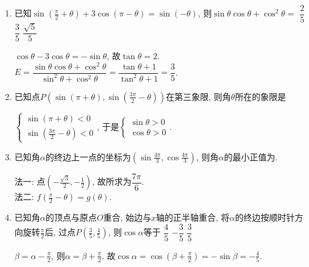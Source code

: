 \begin{enumerate}
\item 已知$\sin\left(\frac{\pi}{2}+\theta\right)+3\cos\left(\pi-\theta\right)=\sin\left(-\theta\right)$, 则$\sin\theta\cos\theta+\cos^2\theta=$
{$\dfrac{2}{5}$}
{$\dfrac{3}{5}$}
{$\dfrac{\sqrt5}{5}$}
\begin{jieda}
$\cos\theta-3\cos\theta=-\sin\theta$, 故$\tan\theta=2$. \\
$E=\dfrac{\sin\theta\cos\theta+\cos^2\theta}{\sin^2\theta+\cos^2\theta}=\dfrac{\tan\theta+1}{\tan^2\theta+1}=\dfrac{3}{5}$. 
\end{jieda}

\item 已知点$P\left(\sin\left(\pi+\theta\right),\sin\left(\frac{3\pi}{2}-\theta\right)\right)$在第三象限, 则角$\theta$所在的象限是
\begin{jieda}
$\begin{cases}
\sin\left(\pi+\theta\right)<0\\
\sin\left(\frac{3\pi}{2}-\theta\right)<0
\end{cases}$, 
于是$\begin{cases}
\sin\theta>0\\
\cos\theta>0
\end{cases}$. 
\end{jieda}


\item 已知角$\alpha$的终边上一点的坐标为$\left(\sin\frac{4\pi}{3},\cos\frac{4\pi}{3}\right)$, 则角$\alpha$的最小正值为.
\begin{jieda}
法一: 点$\left(-\frac{\sqrt{3}}{2},-\frac{1}{2}\right)$, 故所求为$\dfrac{7\pi}{6}$. \\
法二: $f\left(\frac{\pi}{2}-\theta\right)=g\left(\theta\right)$. 
\end{jieda}

\item 已知角$\alpha$的顶点与原点$O$重合, 始边与$x$轴的正半轴重合, 将$\alpha$的终边按顺时针方向旋转$\frac{\pi}{2}$后, 
过点$P\left(\frac{3}{5},\frac{4}{5}\right)$, 则$\cos\alpha$等于
{$\dfrac{4}{5}$}
{$-\dfrac{3}{5}$}
{$\dfrac{3}{5}$}
\begin{jieda}
$\beta=\alpha-\frac{\pi}{2}$, 则$\alpha=\beta+\frac{\pi}{2}$. 
故$\cos\alpha=\cos\left(\beta+\frac{\pi}{2}\right)=-\sin\beta=-\frac{4}{5}$. 
\end{jieda}


\end{enumerate}
